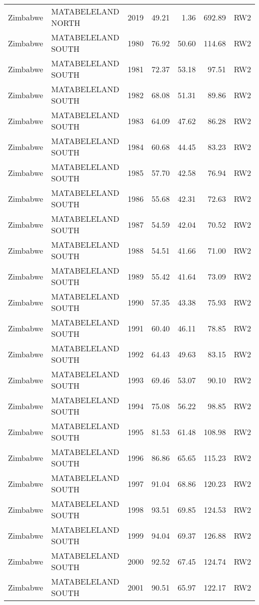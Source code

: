 \begin{longtable}{lllrrrl}
  Zimbabwe & MATABELELAND NORTH & 2019 & 49.21 & 1.36 & 692.89 & RW2 \\ 
  Zimbabwe & MATABELELAND SOUTH & 1980 & 76.92 & 50.60 & 114.68 & RW2 \\ 
  Zimbabwe & MATABELELAND SOUTH & 1981 & 72.37 & 53.18 & 97.51 & RW2 \\ 
  Zimbabwe & MATABELELAND SOUTH & 1982 & 68.08 & 51.31 & 89.86 & RW2 \\ 
  Zimbabwe & MATABELELAND SOUTH & 1983 & 64.09 & 47.62 & 86.28 & RW2 \\ 
  Zimbabwe & MATABELELAND SOUTH & 1984 & 60.68 & 44.45 & 83.23 & RW2 \\ 
  Zimbabwe & MATABELELAND SOUTH & 1985 & 57.70 & 42.58 & 76.94 & RW2 \\ 
  Zimbabwe & MATABELELAND SOUTH & 1986 & 55.68 & 42.31 & 72.63 & RW2 \\ 
  Zimbabwe & MATABELELAND SOUTH & 1987 & 54.59 & 42.04 & 70.52 & RW2 \\ 
  Zimbabwe & MATABELELAND SOUTH & 1988 & 54.51 & 41.66 & 71.00 & RW2 \\ 
  Zimbabwe & MATABELELAND SOUTH & 1989 & 55.42 & 41.64 & 73.09 & RW2 \\ 
  Zimbabwe & MATABELELAND SOUTH & 1990 & 57.35 & 43.38 & 75.93 & RW2 \\ 
  Zimbabwe & MATABELELAND SOUTH & 1991 & 60.40 & 46.11 & 78.85 & RW2 \\ 
  Zimbabwe & MATABELELAND SOUTH & 1992 & 64.43 & 49.63 & 83.15 & RW2 \\ 
  Zimbabwe & MATABELELAND SOUTH & 1993 & 69.46 & 53.07 & 90.10 & RW2 \\ 
  Zimbabwe & MATABELELAND SOUTH & 1994 & 75.08 & 56.22 & 98.85 & RW2 \\ 
  Zimbabwe & MATABELELAND SOUTH & 1995 & 81.53 & 61.48 & 108.98 & RW2 \\ 
  Zimbabwe & MATABELELAND SOUTH & 1996 & 86.86 & 65.65 & 115.23 & RW2 \\ 
  Zimbabwe & MATABELELAND SOUTH & 1997 & 91.04 & 68.86 & 120.23 & RW2 \\ 
  Zimbabwe & MATABELELAND SOUTH & 1998 & 93.51 & 69.85 & 124.53 & RW2 \\ 
  Zimbabwe & MATABELELAND SOUTH & 1999 & 94.04 & 69.37 & 126.88 & RW2 \\ 
  Zimbabwe & MATABELELAND SOUTH & 2000 & 92.52 & 67.45 & 124.74 & RW2 \\ 
  Zimbabwe & MATABELELAND SOUTH & 2001 & 90.51 & 65.97 & 122.17 & RW2 \\ 

\end{longtable}
